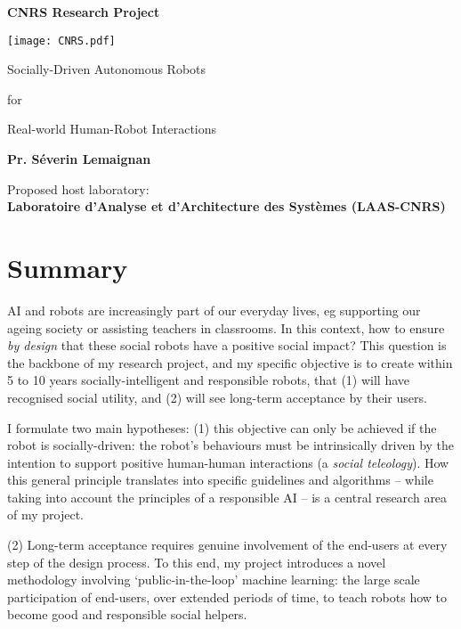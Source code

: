 \documentclass[12pt,a4paper]{article}
\title{\project}
\begin{document}
\begin{center}

    \textbf{\LARGE CNRS Research Project}

    \vspace{1cm}
    \texttt{[image: CNRS.pdf]}


    \vspace{3cm}
    {\Huge Socially-Driven Autonomous Robots}

    \vspace{0.5cm}
    {\LARGE for}

    \vspace{0.5cm}
    {\Huge Real-world Human-Robot Interactions}

    \vspace{2cm}
    {\LARGE\bf Pr. Séverin Lemaignan}

    \vspace{3cm}
    {\Large Proposed host laboratory:\\ \bf Laboratoire d'Analyse et d'Architecture des Systèmes (LAAS-CNRS)}
\end{center}

    \vspace{3cm}

\newpage

\section*{Summary}\label{abstract}


AI and robots are increasingly part of our
everyday lives, eg supporting our ageing society or assisting teachers in
classrooms. In this context, how to ensure \emph{by design} that these social robots
have a positive social impact? This question is the backbone of my
research project, and my specific objective is to create within 5 to 10 years
socially-intelligent and responsible robots, that (1) will have recognised
social utility, and (2) will see long-term acceptance by their users.

I formulate two main hypotheses: (1) this objective can only be achieved if the
robot is socially-driven: the robot's behaviours must be intrinsically driven by
the intention to support positive human-human interactions (a \emph{social
teleology}). How this general principle translates into specific guidelines and
algorithms -- while taking into account the principles of a responsible AI -- is
a central research area of my project.

(2) Long-term acceptance requires genuine involvement of the end-users at every
step of the design process. To this end, my project introduces a novel methodology
involving `public-in-the-loop' machine learning: the large scale participation
of end-users, over extended periods of time, to teach robots how to become 
good and responsible social helpers.
\end{document}
